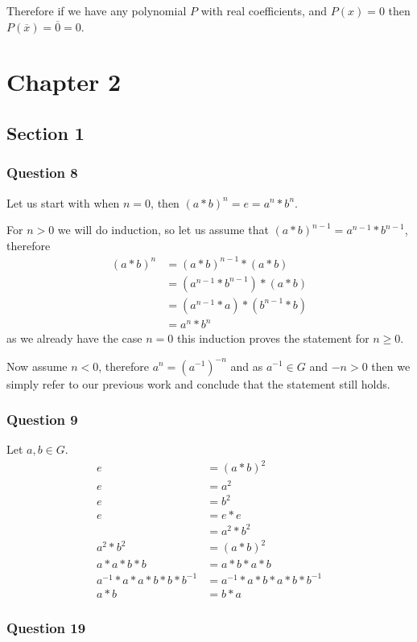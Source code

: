 \documentclass{article}
\begin{document}
Therefore if we have any polynomial $P$ with real coefficients, and $P(x) = 0$ then $P(\overline x) = \overline 0 = 0$.


\section{Chapter 2}
\subsection{Section 1}
\subsubsection{Question 8}
Let us start with when $n=0$, then $(a*b)^n = e = a^n*b^n$.

For $n > 0$ we will do induction, so let us assume that $(a*b)^{n-1} = a^{n-1}*b^{n-1}$, therefore 
\begin{align*}
(a*b)^n &= (a*b)^{n-1}*(a*b) \\
&= (a^{n-1}*b^{n-1}) * (a * b) \\
&= (a^{n-1} * a) * (b^{n-1} * b) \\
&= a^n * b^n
\end{align*}
as we already have the case $n=0$ this induction proves the statement for $n\ge 0$.

Now assume $n<0$, therefore $a^n = \left(a^{-1}\right)^{-n}$ and as $a^{-1} \in G$ and $-n > 0$ then we simply refer to our previous work and conclude that the statement still holds.

\subsubsection{Question 9}

Let $a,b\in G$.
\begin{align*}
e &= (a*b)^2 \\
e &=  a^2 \\
e &= b^2 \\
e &= e * e \\
&= a^2 * b^2\\
a^2 * b^2 &= (a*b)^2\\
a*a*b*b &= a*b*a*b \\
a^{-1}*a*a*b*b*b^{-1} &= a^{-1}*a*b*a*b*b^{-1}\\
a*b &= b*a
\end{align*}

\subsubsection{Question 19}
\end{document}
